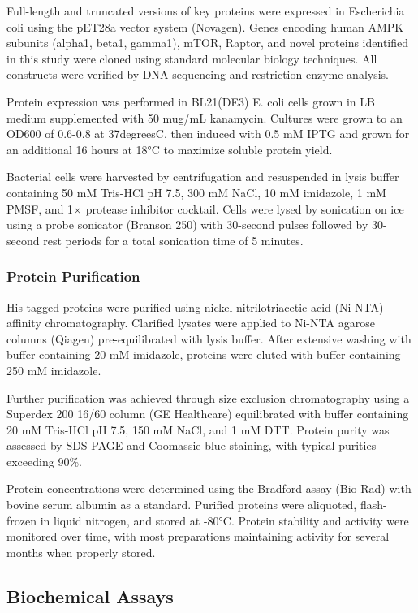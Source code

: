\documentclass[11pt,a4paper]{article}
\begin{document}
Full-length and truncated versions of key proteins were expressed in Escherichia coli using the pET28a vector system (Novagen). Genes encoding human AMPK subunits (alpha1, beta1, gamma1), mTOR, Raptor, and novel proteins identified in this study were cloned using standard molecular biology techniques. All constructs were verified by DNA sequencing and restriction enzyme analysis.

Protein expression was performed in BL21(DE3) E. coli cells grown in LB medium supplemented with 50 mug/mL kanamycin. Cultures were grown to an OD600 of 0.6-0.8 at 37degreesC, then induced with 0.5 mM IPTG and grown for an additional 16 hours at 18°C to maximize soluble protein yield.

Bacterial cells were harvested by centrifugation and resuspended in lysis buffer containing 50 mM Tris-HCl pH 7.5, 300 mM NaCl, 10 mM imidazole, 1 mM PMSF, and 1× protease inhibitor cocktail. Cells were lysed by sonication on ice using a probe sonicator (Branson 250) with 30-second pulses followed by 30-second rest periods for a total sonication time of 5 minutes.

\subsubsection{Protein Purification}

His-tagged proteins were purified using nickel-nitrilotriacetic acid (Ni-NTA) affinity chromatography. Clarified lysates were applied to Ni-NTA agarose columns (Qiagen) pre-equilibrated with lysis buffer. After extensive washing with buffer containing 20 mM imidazole, proteins were eluted with buffer containing 250 mM imidazole.

Further purification was achieved through size exclusion chromatography using a Superdex 200 16/60 column (GE Healthcare) equilibrated with buffer containing 20 mM Tris-HCl pH 7.5, 150 mM NaCl, and 1 mM DTT. Protein purity was assessed by SDS-PAGE and Coomassie blue staining, with typical purities exceeding 90\%.

Protein concentrations were determined using the Bradford assay (Bio-Rad) with bovine serum albumin as a standard. Purified proteins were aliquoted, flash-frozen in liquid nitrogen, and stored at -80°C. Protein stability and activity were monitored over time, with most preparations maintaining activity for several months when properly stored.

\subsection{Biochemical Assays}
\end{document}
